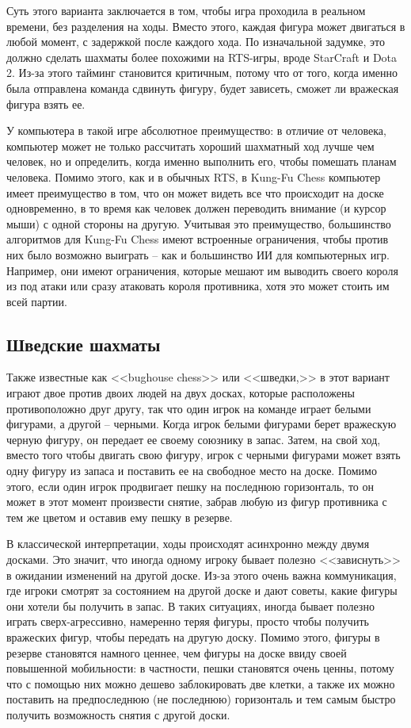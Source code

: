 \documentclass{article}
\begin{document}
Суть этого варианта заключается в том, 
чтобы игра проходила в реальном времени,
без разделения на ходы. 
Вместо этого, каждая фигура может двигаться в любой момент,
с задержкой после каждого хода.
По изначальной задумке, это должно сделать шахматы более похожими на
RTS-игры, вроде StarCraft и Dota 2.
Из-за этого тайминг становится критичным,
потому что от того, когда именно была отправлена команда сдвинуть фигуру,
будет зависеть, сможет ли вражеская фигура взять ее.

У компьютера в такой игре абсолютное преимущество:
в отличие от человека, компьютер может не только рассчитать хороший шахматный ход лучше чем человек,
но и определить, когда именно выполнить его, чтобы помешать планам человека.
Помимо этого, как и в обычных RTS, в Kung-Fu Chess
компьютер имеет преимущество в том, что он может видеть все что происходит на доске одновременно,
в то время как человек должен переводить внимание (и курсор мыши) с одной стороны на другую.
Учитывая это преимущество,
большинство алгоритмов для Kung-Fu Chess 
имеют встроенные ограничения,
чтобы против них было возможно выиграть -- 
как и большинство ИИ для компьютерных игр.
Например, они имеют ограничения,
которые мешают им выводить своего короля из под атаки
или сразу атаковать короля противника,
хотя это может стоить им всей партии.

\subsection{Шведские шахматы}

Также известные как <<bughouse chess>> или <<шведки,>>
в этот вариант играют двое против двоих людей на двух досках,
которые расположены противоположно друг другу,
так что один игрок на команде играет белыми фигурами, а другой -- черными.
Когда игрок белыми фигурами берет вражескую черную фигуру, он передает ее
своему союзнику в запас.
Затем, на свой ход, вместо того чтобы двигать свою фигуру,
игрок с черными фигурами может взять одну фигуру из запаса и поставить ее на свободное место на доске.
Помимо этого, если один игрок продвигает пешку на последнюю горизонталь,
то он может в этот момент произвести снятие, забрав любую из фигур противника с тем же цветом и оставив ему пешку в резерве.

В классической интерпретации, ходы происходят асинхронно между двумя досками.
Это значит, что иногда одному игроку бывает полезно <<зависнуть>>
в ожидании изменений на другой доске.
Из-за этого очень важна коммуникация, где игроки смотрят за состоянием на другой доске
и дают советы, какие фигуры они хотели бы получить в запас. 
В таких ситуациях, иногда бывает полезно играть сверх-агрессивно,
намеренно теряя фигуры,
просто чтобы получить вражеских фигур, чтобы передать на другую доску.
Помимо этого, фигуры в резерве становятся намного ценнее, чем фигуры на доске ввиду своей повышенной мобильности:
в частности, пешки становятся очень ценны,
потому что с помощью них можно дешево заблокировать две клетки,
а также их можно поставить на предпоследнюю (не последнюю) горизонталь и тем самым быстро получить возможность снятия с другой доски.
\end{document}
